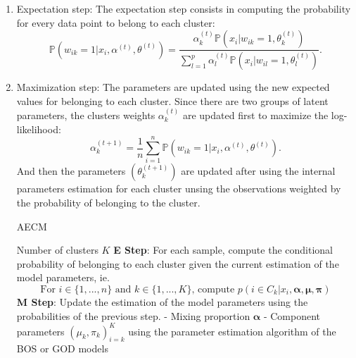 \begin{enumerate}
    \item Expectation step: The expectation step consists in computing the probability for every data point to belong to each cluster:
    \begin{equation}
        \mathbb{P}(w_{ik}=1|x_i, \alpha^{(t)}, \theta^{(t)}) = \frac{\alpha_k^{(t)}\mathbb{P}(x_i|w_{ik}=1, \theta_k^{(t)})}{\sum_{l=1}^p\alpha_l^{(t)}\mathbb{P}(x_i|w_{il}=1, \theta_l^{(t)})}.
    \end{equation}
    \item Maximization step: The parameters are updated using the new expected values for belonging to each cluster. Since there are two groups of latent parameters, the clusters weights $\alpha_k^{(t)}$ are updated first to maximize the log-likelihood:
    \begin{equation}
    \alpha_k^{(t+1)} = \frac{1}{n} \sum_{i=1}^n \mathbb{P}(w_{ik}=1|x_i, \alpha^{(t)}, \theta^{(t)}).
    \end{equation}
    And then the parameters $(\theta_k^{(t + 1)})$ are updated after using the internal parameters estimation for each cluster unsing the observations weighted by the probability of belonging to the cluster.

\begin{algorithm}
\caption{AECM}
\label{alg:aecm}
\begin{algorithmic}[1]
\Require Number of clusters $K$
    \State \textbf{E Step}: For each sample, compute the conditional probability of belonging to each cluster given the current estimation of the model parameters, ie.
    $$\text{For $i\in\{1,...,n\}$ and $k\in\{1,...,K\}$, compute }p(i\in C_k | x_i, \boldsymbol{\alpha}, \boldsymbol{\mu}, \boldsymbol{\pi})$$
    \State \textbf{M Step}: Update the estimation of the model parameters using the probabilities of the previous step.
    \State \quad - Mixing proportion $\boldsymbol{\alpha}$
    \State \quad - Component parameters $(\mu_k,\pi_k)_{i=k}^K$ using the parameter estimation algorithm of the BOS or GOD models
\EndWhile
\end{algorithmic}
\end{algorithm}
\end{enumerate}

